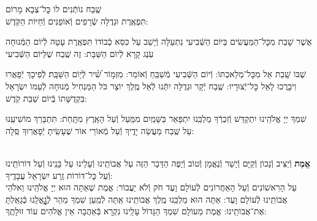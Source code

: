 \documentclass[twoside, openany, parskip=half, 11pt]{book}
\begin{document}
\shatz שֶֽׁבַח נוֹתְֿנִים לוֹ כׇּל־צְבָא מָרוֹם \\
תִּפְאֶֽרֶת וּגְדֻלָּה שְֿׂרָפִים וְֿאוֹפַנִּים וְֿחַיּוֹת הַקֹּֽדֶשׁ:

\chazzan {}
אֲשֶׁר שָׁבַת מִכׇּל־הַמַּעֲשִׂים בַּיּוֹם הַשְּֿׁבִיעִי נִתְעַלָּה וְֿיָשַׁב עַל כִּסֵּא כְֿבוֹדוֹ תִּפְאֶֽרֶת עָטָה לְֿיוֹם הַמְּֿנוּחָה עֹֽנֶג קָרָא לְֿיוֹם הַשַּׁבָּת: זֶה שֶֽׁבַח שֶׁלַּיּוֹם הַשְּֿׁבִיעִי

\kahal
שֶׁבּוֹ שָֽׁבַת אֵל מִכׇּל־מְלַאכְתּוֹ: וְֿיוֹם הַשְּֿׁבִיעִי מְֿשַׁבֵּֽחַ וְֿאוֹמֵר:
%
מִזְמ֥וֹר שִׁ֝֗יר לְֿי֥וֹם הַשַּׁבָּֽת׃ לְֿפִיכָךְ יְֿפָאֲרוּ וִיבָרֲכוּ לָאֵל כׇּל־יְֿצוּרָיו: שֶֽׁבַח יְֿקָר וּגְדֻלָּה יִתְּֿנוּ לְֿאֵל מֶֽלֶךְ יוֹצֵר כֹּל הַמַּנְחִיל מְֿנוּחָה לְֿעַמּוֹ יִשְׂרָאֵל בִּקְדֻשָּׁתוֹ בְּֿיוֹם שַׁבַּת קֹֽדֶשׁ:

\chazzan
שִׁמְךָ יְיָ אֱלֹהֵֽינוּ יִתְקַדַּשׁ וְֿזִכְרְֿךָ מַלְכֵּֽנוּ יִתְפָּאַר בַּשָּׁמַֽיִם מִמַּֽעַל וְֿעַל הָאָֽרֶץ מִתָּֽחַת:
תִּתְבָּרַךְ מוֹשִׁיעֵֽנוּ עַל שֶֽׁבַח מַעֲשֵׂה יָדֶֽיךָ וְֿעַל מְֿאוֹרֵי אוֹר שֶׁעָשִֽׂיתָ יְֿפָאֲרֽוּךָ סֶּֽלָה:


\label{tisbarach}
\yotzerhameoros

\ahavaraba

\shema

\veahavta

\vehaya

\vayomer{}

 \smallskip

\begin{paracol}{2}
\\
\textbf{
אֱמֶת
}
וְֿיַצִּיב וְֿנָכוֹן וְֿקַיָּם וְֿיָשָׁר וְֿנֶאֱמָן וְֿטוֹב וְֿיָפֶה הַדָּבָר הַזֶּה עַל אֲבוֹתֵֽינוּ וְֿעָלֵינוּ עַל בָּנֵֽינוּ וְֿעַל דּוֹרוֹתֵֽינוּ וְֿעַל כׇּל־דּוֹרוֹת זֶֽרַע יִשְׂרָאֵל עֲבָדֶֽיךָ:\\
עַל הָרִאשׁוֹנִים וְֿעַל הָאַחֲרוֹנִים לְֿעוֹלָם וָעֶד חֹק וְֿלֹא יַעֲבוֹר: אֱמֶת שֶׁאַתָּה הוּא יְיָ אֱלֹהֵֽינוּ וֵאלֹהֵי אֲבוֹתֵֽינוּ לְֿעוֹלָם וָעֶד: אַתָּה הוּא מַלְכֵּֽנוּ מֶֽלֶךְ אֲבוֹתֵֽינוּ אַֽתָּה לְֿמַֽעַן שִׁמְךָ מַהֵר לְֿגׇׇׇׇׇׇָאֳלֵֽנוּ כְּֿגָאַֽלְתָּ אֶת־אֲבוֹתֵֽינוּ: אֱמֶת מֵעוֹלָם שִׁמְךָ הַגָּדוֹל עָלֵֽינוּ נִקְרָא בְּֿאַהֲבָה אֵין אֱלֹהִים עוֹד זוּלָתֶֽךָ:

\switchcolumn

\emesveyatziv

\end{paracol}

\ezrasavoseinu

\clearpage

\gaalyisroel
\end{document}
